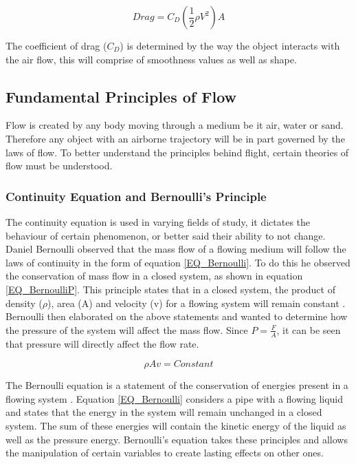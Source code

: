 \begin{equation}
\label{EQ_Drag}
Drag = C_D (\frac{1}{2} \rho V^2) A
\end{equation}

The coefficient of drag ($C_D$) is determined by the way the object interacts with the air flow, this will comprise of smoothness values as well as shape. 


	\subsection{Fundamental Principles of Flow}
	Flow is created by any body moving through a medium be it air, water or sand. Therefore any object with an airborne trajectory will be in part governed by the laws of flow. To better understand the principles behind flight, certain theories of flow must be understood.
	
		\subsubsection{Continuity Equation and Bernoulli's Principle}
		The continuity equation is used in varying fields of study, it dictates the behaviour of certain phenomenon, or better said their ability to not change. Daniel Bernoulli observed that the mass flow of a flowing medium will follow the laws of continuity in the form of equation \eqref{EQ_Bernoulli}. To do this he observed the conservation of mass flow in a closed system, as shown in equation \eqref{EQ_BernoulliP}. This principle states that in a closed system, the product of density ($\rho$), area (A) and velocity (v) for a flowing system will remain constant \cite{Dayle}. Bernoulli then elaborated on the above statements and wanted to determine how the pressure of the system will affect the mass flow. Since $P = \frac{F}{A}$, it can be seen that pressure will directly affect the flow rate.
		
		\begin{equation}
		\label{EQ_BernoulliP}
		\rho Av = Constant
		\end{equation} 
		
		The Bernoulli equation is a statement of the conservation of energies present in a flowing system \cite{Dayle}. Equation \ref{EQ_Bernoulli} considers a pipe with a flowing liquid and states that the energy in the system will remain unchanged in a closed system. The sum of these energies will contain the kinetic energy of the liquid as well as the pressure energy. Bernoulli's equation takes these principles and allows the manipulation of certain variables to create lasting effects on other ones.
		
